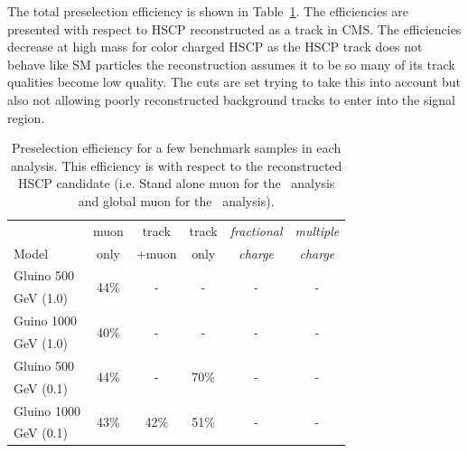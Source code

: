 The total preselection efficiency is shown in Table~\ref{tab:preselectionEff}. The efficiencies are presented with respect to HSCP reconstructed as a track in CMS.
The efficiencies decrease at high mass for color charged HSCP as the HSCP track does not behave like SM particles the reconstruction assumes it to be so many of its track
qualities become low quality. The cuts are set trying to take this into account but also not allowing poorly reconstructed background tracks to enter into the signal region.


\begin{table}
 \begin{center}
  \caption{Preselection efficiency for a few benchmark samples in each analysis.  
This efficiency is with respect to the reconstructed HSCP candidate (i.e. Stand alone muon for the \tkonly\ analysis and global muon for the \tktof\ analysis).
     \label{tab:preselectionEff}}
   \begin{tabular}{|l|c|c|c|c|c|} \hline
                         & muon           & track        & track        & {\em fractional} & {\em multiple} \\
Model                    & only           & +muon        & only         & {\em charge} & {\em charge}          \\ \hline
Gluino 500   & \multirow{2}{*}{44\%} & \multirow{2}{*}{-}    & \multirow{2}{*}{-}    & \multirow{2}{*}{-}    & \multirow{2}{*}{-} \\
GeV (1.0)     &     	      	      	&     	      	      	&     	      	      	&     	      	      	&     	      	     \\ \hline
Guino 1000    & \multirow{2}{*}{40\%} & \multirow{2}{*}{-}    & \multirow{2}{*}{-}    & \multirow{2}{*}{-}    & \multirow{2}{*}{-} \\
GeV (1.0)     &     	      	      	&     	      	      	&     	      	      	&     	      	      	&     	      	     \\ \hline
Gluino 500    & \multirow{2}{*}{44\%} & \multirow{2}{*}{-}    & \multirow{2}{*}{70\%} & \multirow{2}{*}{-}    & \multirow{2}{*}{-} \\
GeV (0.1)     &     	      	      	&     	      	      	&     	      	      	&     	      	      	&     	      	     \\ \hline
Gluino 1000   & \multirow{2}{*}{43\%} & \multirow{2}{*}{42\%} & \multirow{2}{*}{51\%} & \multirow{2}{*}{-}    & \multirow{2}{*}{-} \\
GeV (0.1)     &     	      	      	&     	      	      	&     	      	      	&     	      	      	&     	      	     \\ \hline

\end{tabular}
\end{center}
\end{table}
